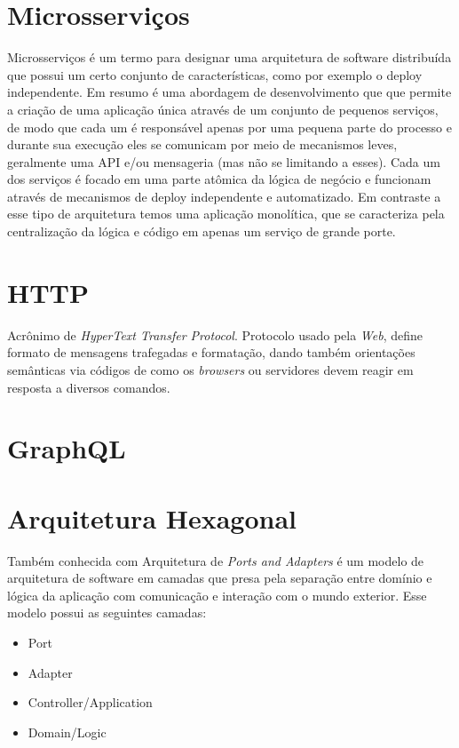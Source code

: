 	\section{Microsserviços}
	
	Microsserviços é um termo para designar uma arquitetura de software distribuída que possui um certo conjunto de características, como por exemplo o deploy independente. Em resumo é uma abordagem de desenvolvimento que que permite a criação de uma aplicação única através de um conjunto de pequenos serviços, de modo que cada um é responsável apenas por uma pequena parte do processo e durante sua execução eles se comunicam por meio de mecanismos leves, geralmente uma API e/ou mensageria (mas não se limitando a esses). Cada um dos serviços é focado em uma parte atômica da lógica de negócio e funcionam através de mecanismos de deploy independente e automatizado. Em contraste a esse tipo de arquitetura temos uma aplicação monolítica, que se caracteriza pela centralização da lógica e código em apenas um serviço de grande porte.
	
	\section{HTTP}
	Acrônimo de \textit{HyperText Transfer Protocol}. Protocolo usado pela \textit{Web}, define formato de mensagens trafegadas e formatação, dando também orientações semânticas via códigos\cite{httpcodes} de como os \textit{browsers} ou servidores devem reagir em resposta a diversos comandos.
	
	\section{GraphQL}
	
	\section{Arquitetura Hexagonal}
	
	Também conhecida com Arquitetura de \textit{Ports and Adapters} é um modelo de arquitetura de software em camadas que presa pela separação entre domínio e lógica da aplicação com comunicação e interação com o mundo exterior. Esse modelo possui as seguintes camadas:
	
	\begin{itemize}
	    \item Port
	    \item Adapter
	    \item Controller/Application
	    \item Domain/Logic
	\end{itemize}
	

